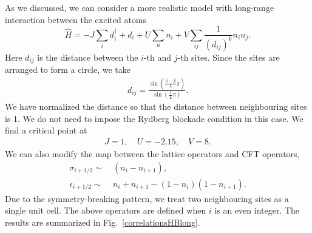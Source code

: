 \documentclass[prb,twocolumn,11pt]{revtex4-1}
\begin{document}
As we discussed, we can consider a more realistic model with long-range interaction between the excited atoms
\begin{equation}
    \hat{H}=-J \sum_i d_i^{\dagger}+d_i+ U \sum_u n_i + V\sum_{ij}\frac{1}{(d_{ij})^6}  n_{i}n_{j}.
\end{equation}
Here $d_{ij}$ is the distance between the $i$-th and $j$-th sites. Since the sites are arranged to form a circle, we take
\begin{align}
    d_{ij}=\frac{\sin(\frac{|i-j|}{L}\pi)}{\sin(\frac{1}{L}\pi)}.
\end{align}
We have normalized the distance so that the distance between neighbouring sites is 1.
We do not need to impose the Rydberg blockade condition in this case.
We find a critical point at
\begin{align}
    J=1,\quad U=-2.15,\quad  V=8.
\end{align}
We can also modify the map between the lattice operators and CFT operators,
\begin{align}
    \sigma_{i+1/2}\sim &~(n_i-n_{i+1}),\nonumber\\
    \epsilon_{i+1/2} \sim &~n_i+n_{i+1}- (1-n_{i})(1-n_{i+1}).
\end{align}
Due to the symmetry-breaking pattern, we treat two neighbouring sites as a single unit cell. The above operators are defined when $i$ is an even integer.
The results are summarized in Fig.~\ref{correlationsHBlong}.
\end{document}
